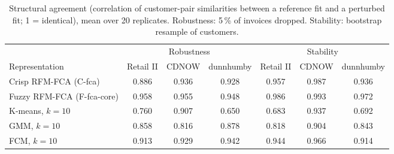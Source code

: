 \begin{table}[t]
\centering\small
\caption{Structural agreement (correlation of customer-pair similarities between a reference fit and a perturbed fit; 1 = identical), mean over 20 replicates. Robustness: 5\,\% of invoices dropped. Stability: bootstrap resample of customers.}
\label{tab:structure}
\begin{tabular}{lcccccc}
\toprule
 & \multicolumn{3}{c}{Robustness} & \multicolumn{3}{c}{Stability} \\
\cmidrule(lr){2-4}\cmidrule(lr){5-7}
Representation & Retail II & CDNOW & dunnhumby & Retail II & CDNOW & dunnhumby \\
\midrule
Crisp RFM-FCA (C-fca) & 0.886 & 0.936 & 0.928 & 0.957 & 0.987 & 0.936 \\
Fuzzy RFM-FCA (F-fca-core) & 0.958 & 0.955 & 0.948 & 0.986 & 0.993 & 0.972 \\
K-means, $k{=}10$ & 0.760 & 0.907 & 0.650 & 0.683 & 0.937 & 0.692 \\
GMM, $k{=}10$ & 0.858 & 0.816 & 0.878 & 0.818 & 0.904 & 0.843 \\
FCM, $k{=}10$ & 0.913 & 0.929 & 0.942 & 0.944 & 0.966 & 0.914 \\
\bottomrule
\end{tabular}
\end{table}
